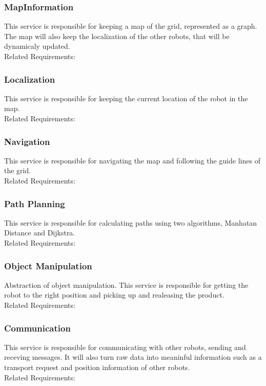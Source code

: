 \subsubsection*{MapInformation}
This service is responsible for keeping a map of the grid, represented as a graph. The map will also keep the localization of the other robots, that will be dynamicaly updated.
\\Related Requirements:

\subsubsection*{Localization}
This service is responsible for keeping the current location of the robot in the map. 
\\Related Requirements:

\subsubsection*{Navigation}
This service is responsible for navigating the map and following the guide lines of the grid. 
\\Related Requirements:

\subsubsection*{Path Planning}
This service is responsible for calculating paths using two algorithms, Manhatan Distance and Dijkstra. 
\\Related Requirements:

\subsubsection*{Object Manipulation}
Abstraction of object manipulation. This service is responsible for getting the robot to the right position and picking up and realeasing the product.
\\Related Requirements:

\subsubsection*{Communication}
This service is responsible for communicating with other robots, sending and receving messages. It will also turn raw data into meaninful information such as a transport request and position information of other robots. 
\\Related Requirements:

